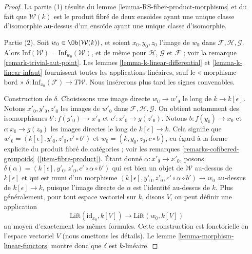 \begin{proof}
La partie (1) résulte du lemme \ref{lemma-RS-fiber-product-morphisms} et du fait
que $\mathcal{W}(k)$ est le produit fibré de deux ensoïdes ayant une unique
classe d'isomorphie au-dessus d'un ensoïde ayant une unique classe
d'isomorphie.

\medskip\noindent
Partie (2). Soit $w_0 \in \Ob(\mathcal{W}(k))$, et soient $x_0, y_0, z_0$
l'image de $w_0$ dans $\mathcal{F}, \mathcal{H}, \mathcal{G}$. Alors
$\text{Inf}(\mathcal{W}) = \text{Inf}_{w_0}(\mathcal{W})$, et de même pour
$\mathcal{H}$, $\mathcal{G}$ et $\mathcal{F}$ ; voir la remarque
\ref{remark-trivial-aut-point}. Les lemmes \ref{lemma-k-linear-differential}
et \ref{lemma-k-linear-infaut} fournissent toutes les applications linéaires,
sauf le « morphisme bord »
$\delta : \text{Inf}_{x_0}(\mathcal{F}) \to T\mathcal{W}$. Nous insérerons
plus tard les signes convenables.

\medskip\noindent
Construction de $\delta$. Choisissons une image directe $w_0 \to w'_0$ le
long de $k \to k[\epsilon]$. Notons $x'_0, y'_0, z'_0$ les images de $w'_0$
dans $\mathcal{F}, \mathcal{H}, \mathcal{G}$. On obtient notamment des
isomorphismes $b' : f(y'_0) \to x'_0$ et $c' : x'_0 \to g(z'_0)$. Notons
$b : f(y_0) \to x_0$ et $c : x_0 \to g(z_0)$ les images directes le long de
$k[\epsilon] \to k$. Cela signifie que
$w'_0 = (k[\epsilon], y'_0, z'_0, c' \circ b')$ et
$w_0 = (k, y_0, z_0, c \circ b)$, eu égard à la forme explicite du produit
fibré de catégories ; voir les remarques \ref{remarks-cofibered-groupoids}
(\ref{item-fibre-product}). Étant donné $\alpha : x'_0 \to x'_0$, posons
$\delta(\alpha) = (k[\epsilon], y'_0, z'_0, c' \circ \alpha \circ b')$
qui est bien un objet de $\mathcal{W}$ au-dessus de $k[\epsilon]$ et qui est
muni d'un morphisme
$(k[\epsilon], y'_0, z'_0, c' \circ \alpha \circ b') \to w_0$ au-dessus de
$k[\epsilon] \to k$, puisque l'image directe de $\alpha$ est l'identité
au-dessus de $k$. Plus généralement, pour tout espace vectoriel sur $k$, disons
$V$, on peut définir une application
$$
\text{Lift}(\text{id}_{x_0}, k[V])
\longrightarrow
\text{Lift}(w_0, k[V])
$$
au moyen d'exactement les mêmes formules. Cette construction est fonctorielle
en l'espace vectoriel $V$ (nous omettons les détails). Le lemme
\ref{lemma-morphism-linear-functors} montre donc que $\delta$ est $k$-linéaire.


\end{proof}
